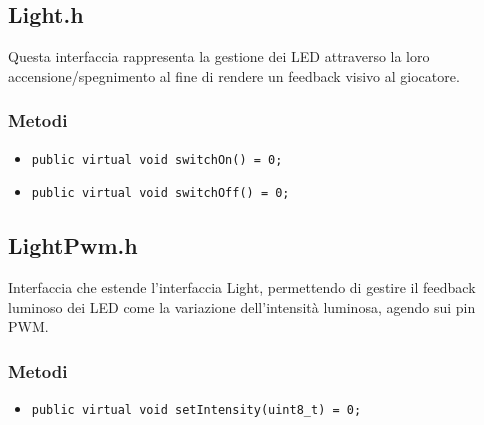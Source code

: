 \subsection{Light.h}
Questa interfaccia rappresenta la gestione dei LED attraverso la loro accensione/spegnimento al fine di rendere un feedback visivo al giocatore.
\subsubsection{Metodi}
\begin{itemize}
	\item \texttt{public virtual void switchOn() = 0;}
	\item \texttt{public virtual void switchOff() = 0;}
\end{itemize}

\subsection{LightPwm.h}
Interfaccia che estende l'interfaccia Light, permettendo di gestire il feedback luminoso dei LED come la variazione dell'intensità luminosa, agendo sui pin PWM.
\subsubsection{Metodi}
\begin{itemize}
	\item \texttt{public virtual void setIntensity(uint8\_t) = 0;}
\end{itemize}

